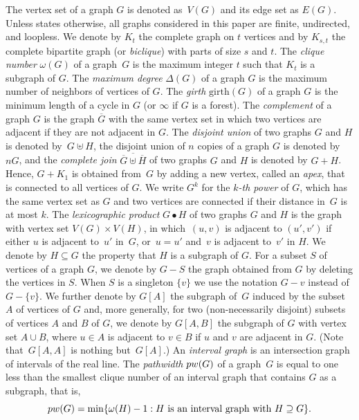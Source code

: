 \documentclass{lmcs}
\newcommand{\newdef}[2]{\hypertarget{def:#1}{\emph{#2}}}
\theoremstyle{definition}
\DeclareMathOperator{\join}{+}
\DeclareMathOperator{\union}{\uplus}
\begin{document}
The vertex set of a graph $G$ is
denoted as~$V(G)$ and its edge set as $E(G)$. Unless states otherwise, all graphs considered
in this paper are finite, undirected, and loopless. 
We denote by $K_t$ the complete graph on $t$
vertices and by $K_{s,t}$ the complete bipartite graph (or \emph{biclique}) with parts of size $s$ and $t$.
The \emph{clique number} 
$\omega(G)$ of a graph~$G$ is the maximum integer $t$ such that $K_t$ is a subgraph of  $G$. The \emph{maximum degree} $\Delta(G)$ of a graph $G$ is the maximum number of neighbors of vertices of $G$.  The \emph{girth} $\mathrm{girth}(G)$ of a graph $G$ is the minimum length of a cycle in $G$ (or $\infty$ if $G$ is a forest).
The {\em complement} of a
graph $G$ is the graph $\overline{G}$ with the same vertex set in
which two vertices are adjacent if they are not adjacent in $G$. The
\emph{disjoint union} of two graphs $G$ and $H$ is denoted by~$G\union H$, the disjoint union of $n$ copies of a graph $G$ is denoted by~$nG$, and the
 {\em complete join} $\overline{\overline{G}\union \overline{H}}$ of two graphs $G$ and $H$ is denoted by  $G\join H$. 
Hence, $G\join K_1$ is obtained from~$G$ by adding a 
new vertex, called an \emph{apex}, that is connected to all vertices of 
$G$. 
We write $G^k$ for the {\em $k$-th
	power} of $G$, which has the same vertex set as $G$ and two vertices
are connected if their distance in~$G$ is at most $k$. 
The {\em lexicographic product} $G\bullet H$ of two
graphs $G$ and $H$ is the graph with vertex set $V(G)\times V(H)$, in
which~$(u,v)$ is adjacent to $(u',v')$ if either $u$ is adjacent 
to~$u'$ in~$G$, or~$u=u'$ and~$v$ is adjacent to~$v'$ in $H$.  
We denote by $H\subseteq G$ the property that $H$ is a subgraph of $G$.
For a subset $S$ of vertices of a graph $G$, we denote by $G-S$ the graph obtained from $G$ by deleting the vertices in $S$. When $S$ is a singleton $\{v\}$ we use the notation $G-v$ instead of $G-\{v\}$. We further denote
by $G[A]$ the subgraph of~$G$ induced by the subset $A$ of vertices of $G$ and, more generally, 
for two (non-necessarily disjoint) subsets of vertices $A$ and $B$ of $G$, we denote by $G[A,B]$ the subgraph of $G$ with vertex set $A\cup B$, where $u\in A$ is adjacent to $v\in B$ if $u$ and $v$ are adjacent in $G$. (Note that~$G[A,A]$ is nothing but~$G[A]$.)
An \emph{interval graph} is an intersection graph of intervals of the real line.
The \newdef{pw}{pathwidth} ${\rm pw}(G)$ of a graph~$G$ is equal to one less than
the smallest clique number of an interval graph that contains $G$ as a
subgraph, that is,
\[{\rm pw}(G)=\min\{\omega(H)-1: H\text{ is an interval graph 
  with }H\supseteq G\}.\]
\end{document}
